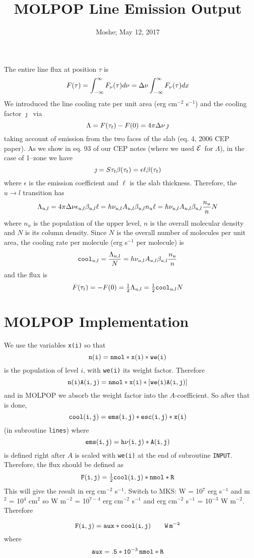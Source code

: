 \documentclass[preprint]{aastex}
\def\eq#1{\begin{equation} #1 \end{equation}}
\def\Dnu     {\hbox{$\Delta\nu$}}
\def\E        {\hbox{${\cal E}$}}
\def\j        {\hbox{${\jmath}$}}
\def\half     {\hbox{$\frac12$}}
\def\tot      {\tau_t}
\begin{document}
\title
                 {MOLPOP Line Emission Output}

\author
{Moshe; May 12, 2017} %

The entire line flux at position $\tau$ is
\eq{
               F(\tau) = \int_{-\infty}^{\infty}F_\nu(\tau)d\nu
                       = \Dnu\int_{-\infty}^{\infty}F_\nu(\tau)dx
}
We introduced the line cooling rate per unit area (erg cm$^{-2}$ s$^{-1}$) and
the cooling factor \j\ via
\eq{
                \Lambda = F(\tot) - F(0) = 4\pi\Dnu\,\j
}
taking account of emission from the two faces of the slab (eq. 4, 2006 CEP
paper). As we show in eq. 93 of our CEP notes (where we used \E\ for
$\Lambda$), in the case of 1--zone we have
\eq{
    \j = S\tot\beta(\tot) = \epsilon\ell\beta(\tot)
}
where $\epsilon$ is the emission coefficient and $\ell$ is the slab thickness.
Therefore, the $u \to l$ transition has
\eq{
   \Lambda_{u,l} = 4\pi\Dnu\epsilon_{u,l}\beta_{u,l}\ell
                 = h\nu_{u,l}A_{u,l}\beta_{u,l}n_u\ell
                 = h\nu_{u,l}A_{u,l}\beta_{u,l}\frac{n_u}{n}N
}
where $n_u$ is the population of the upper level, $n$ is the overall molecular
density and $N$ is its column density. Since $N$ is the overall number of
molecules per unit area, the cooling rate per molecule (erg s$^{-1}$ per
molecule) is
\eq{
   {\tt{cool}}_{u,l} = \frac{\Lambda_{u,l}}{N}
                     = h\nu_{u,l}A_{u,l}\beta_{u,l}\frac{n_u}{n}
}
and the flux is
\eq{
   F(\tot) = -F(0) = \half\Lambda_{u,l}
                   = \half{\tt{cool}}_{u,l} N
}

\section*{MOLPOP Implementation}

We use the variables \texttt{x(i)} so that
\eq{
  \tt n(i) = nmol*x(i)*we(i)
}
is the population of level $i$, with {\tt we(i)} its weight factor. Therefore
\eq{
   \tt n(i) A(i,j) = nmol*x(i)*[we(i) A(i,j)]
}
and in MOLPOP we absorb the weight factor into the $A$-coefficient. So after
that is done,
\eq{
   \tt cool(i,j) = ems(i,j)*esc(i,j)*x(i)
}
(in subroutine {\tt lines}) where
\eq{
   \tt ems(i,j) = h\nu(i,j)*A(i,j)
}
is defined right after $A$ is scaled with {\tt we(i)} at the end of subroutine
{\tt INPUT}. Therefore, the flux should be defined as
\eq{
   \tt F(i,j) = \half cool(i,j)*nmol*R
}
This will give the result in erg cm$^{-2}$ s$^{-1}$. Switch to MKS: W = 10$^7$
erg s$^{-1}$ and m$^2$ = 10$^4$ cm$^2$ so W m$^{-2}$ = 10$^{7 - 4}$ erg
cm$^{-2}$ s$^{-1}$ and erg cm$^{-2}$ s$^{-1}$ = 10$^{-3}$ W m$^{-2}$. Therefore

\eq{
 \tt F(i,j) = aux*cool(i,j) \qquad W\,m^{-2}
}
where
\eq{
   \tt aux = .5*10^{-3}\,nmol*R
}
\end{document}
